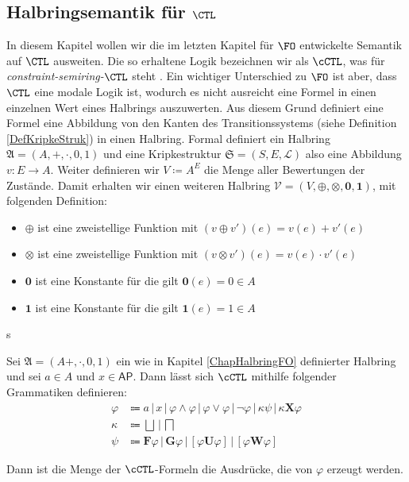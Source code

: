 
\subsection{Halbringsemantik für $\CTL$}
\label{ChapHalbringCTL}

In diesem Kapitel wollen wir die im letzten Kapitel für $\FO$ entwickelte Semantik auf $\CTL$ ausweiten. 
Die so erhaltene Logik bezeichnen wir als $\cCTL$, was für \textit{constraint-semiring-}$\CTL$ steht \cite{lluch2005quantitative}.
Ein wichtiger Unterschied zu $\FO$ ist aber, dass $\CTL$ eine modale Logik ist, wodurch es nicht ausreicht eine Formel in einen einzelnen Wert eines Halbrings auszuwerten.
Aus diesem Grund definiert eine Formel eine Abbildung von den Kanten des Transitionssystems (siehe Definition \ref{DefKripkeStruk}) in einen Halbring.
Formal definiert ein Halbring $\mathfrak{A}=(A,+,\cdot,0,1)$ und eine Kripkestruktur $\mathfrak{S}=(S, E, \mathcal{L})$ also eine Abbildung $v:E\to A$.
Weiter definieren wir $V\coloneqq A^{E}$ die Menge aller Bewertungen der Zustände.
Damit erhalten wir einen weiteren Halbring $\mathcal{V}=(V,\oplus,\otimes,\boldsymbol{0},\boldsymbol{1})$, mit folgenden Definition:
\begin{itemize}
	\item $\oplus$ ist eine zweistellige Funktion mit $(v\oplus v')(e) = v(e)+v'(e)$
	\item $\otimes$ ist eine zweistellige Funktion mit $(v\otimes v')(e) = v(e)\cdot v'(e)$
	\item $\boldsymbol{0}$ ist eine Konstante für die gilt $\boldsymbol{0}(e) = 0\in A$
	\item $\boldsymbol{1}$ ist eine Konstante für die gilt $\boldsymbol{1}(e) = 1\in A$
\end{itemize}s

\begin{definition}
	Sei $\mathfrak{A}=(A+,\cdot,0,1)$ ein wie in Kapitel \ref{ChapHalbringFO} definierter Halbring und sei $a\in A$ und $x\in \mathsf{AP}$. Dann lässt sich $\cCTL$ mithilfe folgender Grammatiken definieren:
	\begin{align*}
		\varphi &\Coloneqq a \, | \, x \, | \, \varphi \land \varphi \, | \, \varphi \lor \varphi \, | \, \neg\varphi \, | \, \kappa \psi \, | \, \kappa \boldsymbol{X}\varphi \\
		\kappa &\Coloneqq \bigsqcup \, | \, \bigsqcap \\
		\psi &\Coloneqq \boldsymbol{F}\varphi \, | \, \boldsymbol{G}\varphi \, | \, [\varphi\boldsymbol{U}\varphi] \, | \, [\varphi\boldsymbol{W}\varphi]
	\end{align*}
	
	Dann ist die Menge der $\cCTL$-Formeln die Ausdrücke, die von $\varphi$ erzeugt werden. \cite{lluch2005quantitative}
\end{definition}

